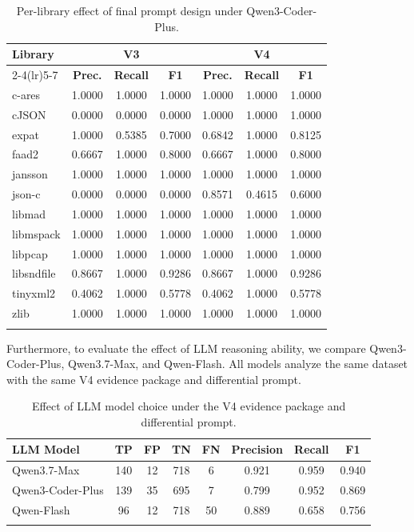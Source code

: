 \documentclass[pdflatex,sn-basic]{sn-jnl}%
\renewcommand{\arraystretch}{1.16}%
\theoremstyle{thmstyleone}%
\theoremstyle{thmstyletwo}%
\theoremstyle{thmstylethree}%
\begin{document}
\begin{table}[!htbp]
\caption{Per-library effect of final prompt design under Qwen3-Coder-Plus.}
\label{tab:per-library-final-prompt}
\centering
\scriptsize
\setlength{\tabcolsep}{2.2pt}
\renewcommand{\arraystretch}{1.08}
\begin{tabular*}{\linewidth}{@{\extracolsep{\fill}}lcccccc}
\toprule
\textbf{Library} & \multicolumn{3}{c}{\textbf{V3}} & \multicolumn{3}{c}{\textbf{V4}} \\
\cmidrule(lr){2-4}\cmidrule(lr){5-7}
& \textbf{Prec.} & \textbf{Recall} & \textbf{F1} & \textbf{Prec.} & \textbf{Recall} & \textbf{F1} \\
\midrule
c-ares & 1.0000 & 1.0000 & 1.0000 & 1.0000 & 1.0000 & 1.0000 \\
cJSON & 0.0000 & 0.0000 & 0.0000 & 1.0000 & 1.0000 & 1.0000 \\
expat & 1.0000 & 0.5385 & 0.7000 & 0.6842 & 1.0000 & 0.8125 \\
faad2 & 0.6667 & 1.0000 & 0.8000 & 0.6667 & 1.0000 & 0.8000 \\
jansson & 1.0000 & 1.0000 & 1.0000 & 1.0000 & 1.0000 & 1.0000 \\
json-c & 0.0000 & 0.0000 & 0.0000 & 0.8571 & 0.4615 & 0.6000 \\
libmad & 1.0000 & 1.0000 & 1.0000 & 1.0000 & 1.0000 & 1.0000 \\
libmspack & 1.0000 & 1.0000 & 1.0000 & 1.0000 & 1.0000 & 1.0000 \\
libpcap & 1.0000 & 1.0000 & 1.0000 & 1.0000 & 1.0000 & 1.0000 \\
libsndfile & 0.8667 & 1.0000 & 0.9286 & 0.8667 & 1.0000 & 0.9286 \\
tinyxml2 & 0.4062 & 1.0000 & 0.5778 & 0.4062 & 1.0000 & 0.5778 \\
zlib & 1.0000 & 1.0000 & 1.0000 & 1.0000 & 1.0000 & 1.0000 \\
\botrule
\end{tabular*}
\end{table}


Furthermore, to evaluate the effect of LLM reasoning ability, we compare Qwen3-Coder-Plus, Qwen3.7-Max, and Qwen-Flash. All models analyze the same dataset with the same V4 evidence package and differential prompt.

\begin{table}[!htbp]
\caption{Effect of LLM model choice under the V4 evidence package and differential prompt.}
\label{tab:llm-model-ablation}
\centering
\scriptsize
\setlength{\tabcolsep}{3.2pt}
\renewcommand{\arraystretch}{1.12}
\begin{tabular*}{\linewidth}{@{\extracolsep{\fill}}lccccccc}
\toprule
\textbf{LLM Model} & \textbf{TP} & \textbf{FP} & \textbf{TN} & \textbf{FN} & \textbf{Precision} & \textbf{Recall} & \textbf{F1} \\
\midrule
Qwen3.7-Max & 140 & 12 & 718 & 6 & 0.921 & 0.959 & 0.940 \\
Qwen3-Coder-Plus & 139 & 35 & 695 & 7 & 0.799 & 0.952 & 0.869 \\
Qwen-Flash & 96 & 12 & 718 & 50 & 0.889 & 0.658 & 0.756 \\
\botrule
\end{tabular*}
\end{table}
\end{document}
